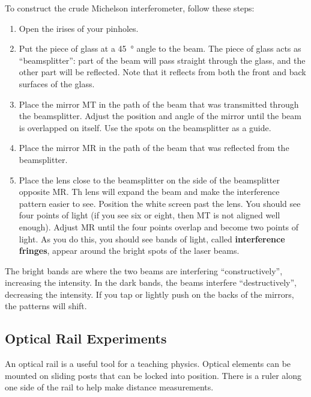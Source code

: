 \documentclass[]{manual}
\begin{document}
    To construct the crude Michelson interferometer, follow these steps:
    \begin{enumerate}
        \item Open the irises of your pinholes.
        \item Put the piece of glass at a \SI{45}{\degree} angle to the beam.
        The piece of glass acts as ``beamsplitter'': part of the beam will pass straight through the glass, and the other part will be reflected. Note that it reflects from both the front and back surfaces of the glass.
        \item Place the mirror MT in the path of the beam that was transmitted through the beamsplitter.
        Adjust the position and angle of the mirror until the beam is overlapped on itself.
        Use the spots on the beamsplitter as a guide.
        \item Place the mirror MR in the path of the beam that was reflected from the beamsplitter.
        \item Place the lens close to the beamsplitter on the side of the beamsplitter opposite MR.
        Th lens will expand the beam and make the interference pattern easier to see.
        Position the white screen past the lens.
        You should see four points of light (if you see six or eight, then MT is not aligned well enough).
        Adjust MR until the four points overlap and become two points of light.
        As you do this, you should see bands of light, called \textbf{interference fringes}, appear around the bright spots of the laser beams.
    \end{enumerate}

    The bright bands are where the two beams are interfering ``constructively'', increasing the intensity.
    In the dark bands, the beams interfere ``destructively'', decreasing the intensity.
    If you tap or lightly push on the backs of the mirrors, the patterns will shift.


    \subsection{Optical Rail Experiments}

    An optical rail is a useful tool for a teaching physics.
    Optical elements can be mounted on sliding posts that can be locked into position.
    There is a ruler along one side of the rail to help make distance measurements.
\end{document}
